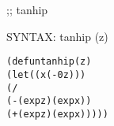 \begin{aibox}{\function}
;; tanhip

SYNTAX: tanhip (z)  
\end{aibox}

\begin{aibox}{\examples}
\begin{alltt}
\end{alltt}

\end{aibox}

\begin{aibox}{\comments}

\end{aibox}
\begin{aibox}{\answers}

\end{aibox}
\begin{aibox}{\othercomments}

\end{aibox}
\begin{aibox}{\pseudocode}

\end{aibox}
\begin{aibox}{\code}

\begin{alltt}
(defun tanhip (z)  
    (let ((x (- 0 z)))
        (/ 
            (- (exp z) (exp x))
            (+ (exp z) (exp x)))))

\end{alltt}
\end{aibox}
